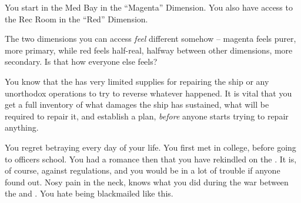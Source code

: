 \documentclass[char]{TMFHope}
\begin{document}
\begin{itemz}[Notes]
	\item You start in the Med Bay in the ``Magenta'' Dimension. You also have access to the Rec Room in the ``Red'' Dimension. 
	\item The two dimensions you can access {\em feel} different somehow -- magenta feels purer, more primary, while red feels half-real, halfway between other dimensions, more secondary.  Is that how everyone else feels?
	\item You know that the \pNew{} has very limited supplies for repairing the ship or any unorthodox operations to try to reverse whatever happened. It is vital that you get a full inventory of what damages the ship has sustained, what will be required to repair it, and establish a plan, \emph{before} anyone starts trying to repair anything.
\end{itemz}

\begin{contacts}
	\contact{\cCap{}} You regret betraying \cCap{} every day of your life.
	\contact{\cSci{}} You first met \cSci{} in college, before going to officers school. You had a romance then that you have rekindled on the \pNew{}. It is, of course, against regulations, and you would be in a lot of trouble if anyone found out.
	\contact{\cDip{}} Nosy pain in the neck, \cDip{} knows what you did during the war between the \pPlan{} and \pEdge{}. You hate being blackmailed like this.
\end{contacts}
\end{document}
